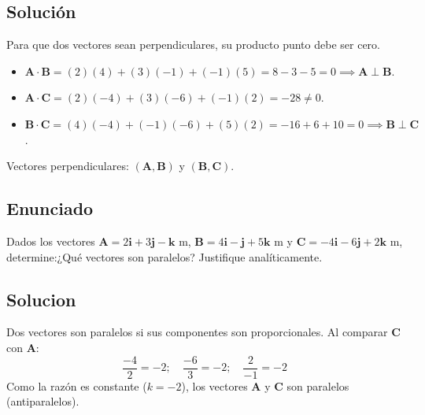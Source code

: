 \documentclass[12pt, a4paper]{article}
\begin{document}
\subsection*{Solución}
Para que dos vectores sean perpendiculares, su producto punto debe ser cero.

\begin{itemize}
    \item $\mathbf{A} \cdot \mathbf{B} = (2)(4) + (3)(-1) + (-1)(5) = 8 - 3 - 5 = 0 \implies \mathbf{A} \perp \mathbf{B}$.
    \item $\mathbf{A} \cdot \mathbf{C} = (2)(-4) + (3)(-6) + (-1)(2) = -28 \neq 0$.
    \item $\mathbf{B} \cdot \mathbf{C} = (4)(-4) + (-1)(-6) + (5)(2) = -16 + 6 + 10 = 0 \implies \mathbf{B} \perp \mathbf{C}$.
\end{itemize}

\begin{tcolorbox}[colback=green!5, colframe=green!50!black, title=Respuesta Final]
Vectores perpendiculares: $(\mathbf{A}, \mathbf{B})$ y $(\mathbf{B}, \mathbf{C})$. \\
\end{tcolorbox}

\newpage

\subsection*{Enunciado}
Dados los vectores $\mathbf{A} = 2\mathbf{i} + 3\mathbf{j} - \mathbf{k} \text{ m}$, $\mathbf{B} = 4\mathbf{i} - \mathbf{j} + 5\mathbf{k} \text{ m}$ y $\mathbf{C} = -4\mathbf{i} - 6\mathbf{j} + 2\mathbf{k} \text{ m}$, determine:¿Qué vectores son paralelos? Justifique analíticamente.


\begin{center}
\end{center}

\subsection*{Solucion}
Dos vectores son paralelos si sus componentes son proporcionales. Al comparar $\mathbf{C}$ con $\mathbf{A}$:
\begin{equation*}
    \frac{-4}{2} = -2; \quad \frac{-6}{3} = -2; \quad \frac{2}{-1} = -2
\end{equation*}
Como la razón es constante ($k = -2$), los vectores $\mathbf{A}$ y $\mathbf{C}$ son paralelos (antiparalelos).
\end{document}
